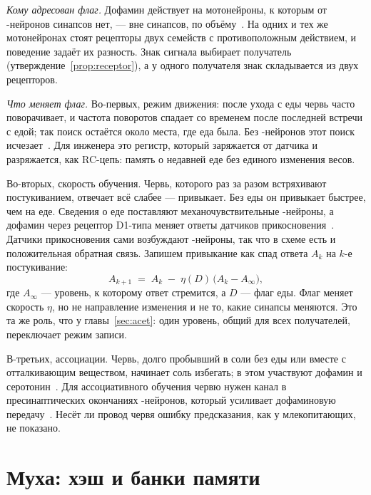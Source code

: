 \emph{Кому адресован флаг.} Дофамин действует на мотонейроны, к которым от -нейронов синапсов нет, --- вне синапсов, по объёму~\cite{Chase2004}. На одних и тех же мотонейронах стоят рецепторы двух семейств с противоположным действием, и поведение задаёт их разность. Знак сигнала выбирает получатель (утверждение~\ref{prop:receptor}), а у одного получателя знак складывается из двух рецепторов.

\emph{Что меняет флаг.} Во-первых, режим движения: после ухода с еды червь часто поворачивает, и частота поворотов спадает со временем после последней встречи с едой; так поиск остаётся около места, где еда была. Без -нейронов этот поиск исчезает~\cite{Hills2004}. Для инженера это регистр, который заряжается от датчика и разряжается, как RC-цепь: память о недавней еде без единого изменения весов.

Во-вторых, скорость обучения. Червь, которого раз за разом встряхивают постукиванием, отвечает всё слабее --- привыкает. Без еды он привыкает быстрее, чем на еде. Сведения о еде поставляют механочувствительные -нейроны, а дофамин через рецептор D1-типа меняет ответы датчиков прикосновения~\cite{Kindt2007,Sanyal2004}. Датчики прикосновения сами возбуждают -нейроны, так что в схеме есть и положительная обратная связь. Запишем привыкание как спад ответа $A_k$ на $k$-е постукивание:
\begin{equation}
A_{k+1} \;=\; A_k \;-\; \eta(D)\,\bigl(A_k - A_\infty\bigr),
\label{eq:habituation}
\end{equation}
где $A_\infty$ --- уровень, к которому ответ стремится, а $D$ --- флаг еды. Флаг меняет скорость $\eta$, но не направление изменения и не то, какие синапсы меняются. Это та же роль, что у  главы~\ref{sec:acet}: один уровень, общий для всех получателей, переключает режим записи.

В-третьих, ассоциации. Червь, долго пробывший в соли без еды или вместе с отталкивающим веществом, начинает соль избегать; в этом участвуют дофамин и серотонин~\cite{Hukema2008}. Для ассоциативного обучения червю нужен канал в пресинаптических окончаниях -нейронов, который усиливает дофаминовую передачу~\cite{Voglis2008}. Несёт ли провод червя ошибку предсказания, как у млекопитающих, не показано.

\section{Муха: хэш и банки памяти}

